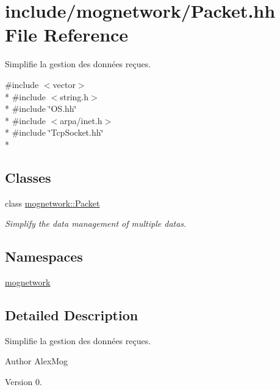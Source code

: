 \hypertarget{_packet_8hh}{\section{include/mognetwork/\-Packet.hh File Reference}
\label{_packet_8hh}
}


Simplifie la gestion des données reçues.  


{\ttfamily \#include $<$vector$>$}\\*
{\ttfamily \#include $<$string.\-h$>$}\\*
{\ttfamily \#include \char`\"{}O\-S.\-hh\char`\"{}}\\*
{\ttfamily \#include $<$arpa/inet.\-h$>$}\\*
{\ttfamily \#include \char`\"{}Tcp\-Socket.\-hh\char`\"{}}\\*
\subsection*{Classes}
\begin{DoxyCompactItemize}
\item 
class \hyperlink{classmognetwork_1_1_packet}{mognetwork\-::\-Packet}
\begin{DoxyCompactList}\small\item\em Simplify the data management of multiple datas. \end{DoxyCompactList}\end{DoxyCompactItemize}
\subsection*{Namespaces}
\begin{DoxyCompactItemize}
\item 
\hyperlink{namespacemognetwork}{mognetwork}
\end{DoxyCompactItemize}


\subsection{Detailed Description}
Simplifie la gestion des données reçues. \begin{DoxyAuthor}{Author}
Alex\-Mog 
\end{DoxyAuthor}
\begin{DoxyVersion}{Version}
0. 
\end{DoxyVersion}
